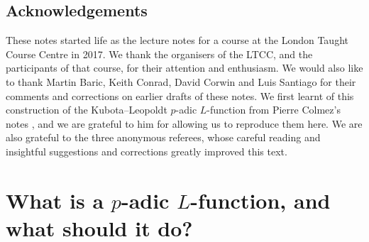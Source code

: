 \documentclass[a4paper,10pt, english, reqno]{smfart}
\numberwithin{equation}{section}
\begin{document}

\subsection*{Acknowledgements}
These notes started life as the lecture notes for a course at the London Taught Course Centre in 2017. We thank the organisers of the LTCC, and the participants of that course, for their attention and  enthusiasm. We would also like to thank Martin Baric, Keith Conrad, David Corwin and Luis Santiago for their comments and corrections on earlier drafts of these notes.  We first learnt of this construction of the Kubota--Leopoldt $p$-adic $L$-function from Pierre Colmez's notes \cite{ColCourse}, and we are grateful to him for allowing us to reproduce them here. We are also grateful to the three anonymous referees, whose  careful reading and insightful suggestions and corrections greatly improved this text.







\section{What is a $p$-adic $L$-function, and what should it do?}\label{sec:riemann to kubota}
\end{document}
